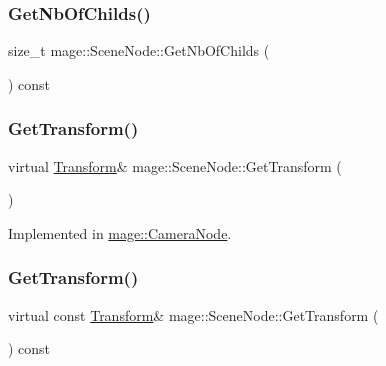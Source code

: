 \hypertarget{classmage_1_1_scene_node_a99c5eb3c253a2e620bd85ac845d3bb77}{}\label{classmage_1_1_scene_node_a99c5eb3c253a2e620bd85ac845d3bb77} 
\subsubsection{\texorpdfstring{Get\+Nb\+Of\+Childs()}{GetNbOfChilds()}}
{\footnotesize\ttfamily size\+\_\+t mage\+::\+Scene\+Node\+::\+Get\+Nb\+Of\+Childs (\begin{DoxyParamCaption}{ }\end{DoxyParamCaption}) const}

\hypertarget{classmage_1_1_scene_node_adbb5020be4054b53efa3682e71f9e6f1}{}\label{classmage_1_1_scene_node_adbb5020be4054b53efa3682e71f9e6f1} 
\subsubsection{\texorpdfstring{Get\+Transform()}{GetTransform()}\hspace{0.1cm}{\footnotesize\ttfamily [1/2]}}
{\footnotesize\ttfamily virtual \hyperlink{structmage_1_1_transform}{Transform}\& mage\+::\+Scene\+Node\+::\+Get\+Transform (\begin{DoxyParamCaption}{ }\end{DoxyParamCaption})\hspace{0.3cm}{\ttfamily [pure virtual]}}



Implemented in \hyperlink{classmage_1_1_camera_node_a24b0b049d4235df85d61138d74483b02}{mage\+::\+Camera\+Node}.

\hypertarget{classmage_1_1_scene_node_a9c8b7cde14ec45f383d214332f789736}{}\label{classmage_1_1_scene_node_a9c8b7cde14ec45f383d214332f789736} 
\subsubsection{\texorpdfstring{Get\+Transform()}{GetTransform()}\hspace{0.1cm}{\footnotesize\ttfamily [2/2]}}
{\footnotesize\ttfamily virtual const \hyperlink{structmage_1_1_transform}{Transform}\& mage\+::\+Scene\+Node\+::\+Get\+Transform (\begin{DoxyParamCaption}{ }\end{DoxyParamCaption}) const\hspace{0.3cm}{\ttfamily [pure virtual]}}



